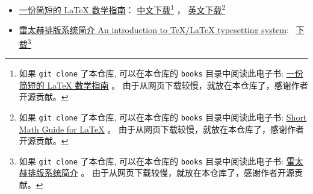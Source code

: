 \documentclass[
    11pt,
    base=hide,
    cite=authoryear,
    device=phone,
    lang=cn,
    mode=simple,
    result=answer,
    toc=onecol,
]{elegantbook_sierxue}
\begin{document}
\begin{itemize}
\begin{itemize}
{                    可以在本仓库的 \lstinline{books}
                    目录中阅读此电子书:
                    \href{books/lshort-zh-cn.pdf}{一份不太简短的LATEX介绍} 。
                    由于从网页下载较慢，就放在本仓库了，感谢作者开源贡献。
                    }
                ，
        \href{http://mirrors.ctan.org/info/lshort/english/lshort.pdf}
                {英文下载}\footnote{
                    如果 \lstinline{git clone} 了本仓库,
                    可以在本仓库的 \lstinline{books}
                    目录中阅读此电子书:
                    \href{books/lshort.pdf}
                    {The Not So Short Introduction to LaTeX} 。
                    由于从网页下载较慢，就放在本仓库了，感谢作者开源贡献。
                    }
            \item
                \href{https://www.ctan.org/tex-archive/info/lshort/chinese}
                {一份简短的 LaTeX 数学指南}：
                \href{https://wenda.latexstudio.net/article-5006.html}
                {中文下载}\footnote{
                    如果 \lstinline{git clone} 了本仓库,
                    可以在本仓库的 \lstinline{books}
                    目录中阅读此电子书:
                    \href{books/short-math-guide_cn.pdf}
                    {一份简短的 LaTeX 数学指南} 。
                    由于从网页下载较慢，就放在本仓库了，感谢作者开源贡献。
                    }
                ，
                \href{http://mirrors.ustc.edu.cn/CTAN/info/short-math-guide/short-math-guide.pdf}
                {英文下载}\footnote{
                    如果 \lstinline{git clone} 了本仓库,
                    可以在本仓库的 \lstinline{books}
                    目录中阅读此电子书:
                    \href{books/short-math-guide.pdf}
                    {Short Math Guide for \LaTeX{}} 。
                    由于从网页下载较慢，就放在本仓库了，感谢作者开源贡献。
                    }
            \item \href{https://github.com/huangxg/lnotes}
                {雷太赫排版系统简介 An introduction to TeX/LaTeX typesetting system}:~%
                    \href{https://github.com/huangxg/lnotes/raw/master/lnotes2.pdf}
                    {下载}\footnote{
                        如果 \lstinline{git clone} 了本仓库,
                        可以在本仓库的 \lstinline{books}
                        目录中阅读此电子书:
                        \href{books/lnotes2.pdf}{雷太赫排版系统简介} 。
                        由于从网页下载较慢，就放在本仓库了，感谢作者开源贡献。
                        }
        \end{itemize}
\end{itemize}
\end{document}
